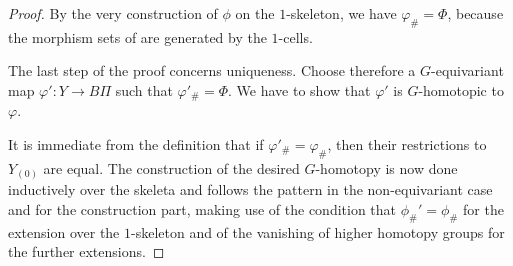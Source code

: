 \documentclass[pdftex]{sigma}
\numberwithin{equation}{section}
\begin{document}
\begin{proof}
		By the very construction of $\phi$ on the $1$-skeleton, we have
		$\varphi_{\#}=\Phi$, because the morphism sets of
		 are
		generated by the $1$-cells.
		
		The last step of the proof concerns uniqueness. Choose therefore a
		$G$-equivariant map
		$\varphi'\colon Y \to B \Pi$ such that
		$\varphi'_{\#}=\Phi$. We have to show that $\varphi'$ is $G$-homotopic to
		$\varphi$.
		
		It is immediate from the definition that if $\varphi'_{\#}=\varphi_{\#}$, then
		their restrictions to $Y_{(0)}$ are equal. The construction of the desired
		$G$-homotopy is now done inductively over the skeleta and follows the pattern
		in the non-equivariant case and for the construction part, making use of the
		condition that $\phi_\#'=\phi_\#$ for the extension over the $1$-skeleton and
		of the vanishing of higher homotopy groups for the further extensions.
	\end{proof}
	
\end{document}
